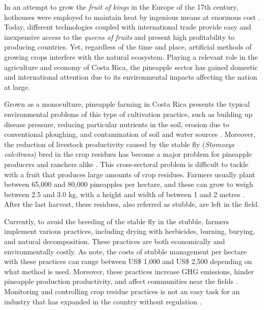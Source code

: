 In an attempt to grow the \textit{fruit of kings} in the Europe of the 17th century, hothouses were employed to maintain heat by ingenious means at enormous cost \citep{o2013pineapple}. Today, different technologies coupled with international trade provide easy and inexpensive access to the \textit{queens of fruits} and present high profitability to producing countries. Yet, regardless of the time and place, artificial methods of growing crops interfere with the natural ecosystem. Playing a relevant role in the agriculture and economy of Costa Rica, the pineapple sector has gained domestic and international attention due to its environmental impacts affecting the nation at large.

Grown as a monoculture, pineapple farming in Costa Rica presents the typical environmental problems of this type of cultivation practice, such as building up disease pressure, reducing particular nutrients in the soil, erosion due to conventional ploughing, and contamination of soil and water sources \citep{rodriguez2020agricultural, salaheen2019organic}. Moreover, the reduction of livestock productivity caused by the stable fly (\textit{Stomoxys calcitrans}) bred in the crop residues has become a major problem for pineapple producers and ranchers alike \citep{alpizar2016analisis, elbersen2019costa}. This cross-sectoral problem is difficult to tackle with a fruit that produces large amounts of crop residues. Farmers usually plant between 65,000 and 80,000 pineapples per hectare, and these can grow to weigh between 2.5 and 3.0 kg, with a height and width of between 1 and 2 metres \citep{asim2015review}. After the last harvest, these residues, also referred as stubble, are left in the field. 


Currently, to avoid the breeding of the stable fly in the stubble, farmers implement various practices, including drying with herbicides, burning, burying, and natural decomposition. These practices are both economically and environmentally costly. As \cite{hernandez2018impact} note, the costs of stubble management per hectare with these practices can range between US\$ 1,000 and US\$ 2,500 depending on what method is used. Moreover, these practices increase GHG emissions, hinder pineapple production productivity, and affect communities near the fields \citep{cesarino2020fabrication,netz2007climate}. Monitoring and controlling crop residue practices is not an easy task for an industry that has expanded in the country without regulation \citep{rodriguez2020agricultural}.

